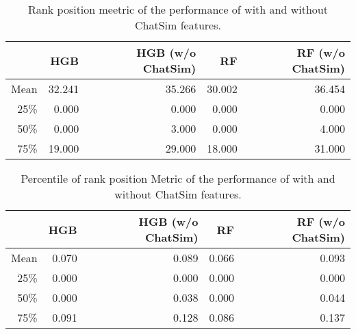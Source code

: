 \begin{table}[h]
    \centering
    \small
    \begin{tabular}{r|rr|rr}
        \hline\hline
        {} & HGB & HGB (w/o ChatSim) & RF & RF (w/o ChatSim) \\ \midrule
        Mean       & 32.241 & 35.266 & 30.002 & 36.454 \\
        25\%       & 0.000  & 0.000  & 0.000  & 0.000  \\
        50\%       & 0.000  & 3.000  & 0.000  & 4.000  \\
        75\%       & 19.000 & 29.000 & 18.000 & 31.000 \\ 
        \hline\hline
    \end{tabular}
    \caption{Rank position meetric of the performance of \toolname with and without ChatSim features.}
    \label{tab:ablation_1}
\end{table}


\begin{table}[h]
    \centering
    \small
    \begin{tabular}{r|rr|rr}
        \hline\hline
        {} & HGB & HGB (w/o ChatSim) & RF & RF (w/o ChatSim) \\ 
        \hline
        Mean       & 0.070 & 0.089 & 0.066 & 0.093 \\
        25\%       & 0.000 & 0.000 & 0.000 & 0.000 \\
        50\%       & 0.000 & 0.038 & 0.000 & 0.044 \\
        75\%       & 0.091 & 0.128 & 0.086 & 0.137 \\
        \hline\hline
    \end{tabular}
    \caption{Percentile of rank position Metric of the performance of \toolname with and without ChatSim features.}
    \label{tab:ablation_2}
\end{table}




